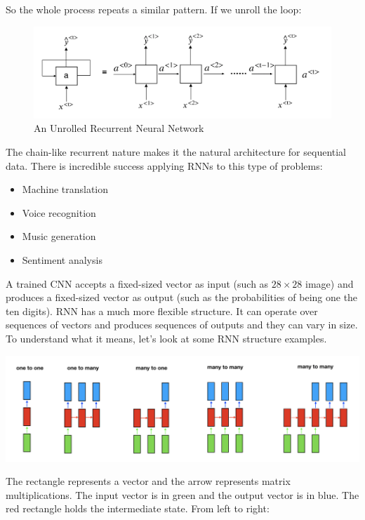 \documentclass[12pt,]{krantz}
\providecommand{\tightlist}{%
  \setlength{\itemsep}{0pt}\setlength{\parskip}{0pt}}
\begin{document}
So the whole process repeats a similar pattern. If we unroll the loop:

\begin{figure}

{\centering \includegraphics[width=0.9\linewidth]{images/rnnrollout} 

}

\caption{An Unrolled Recurrent Neural Network}\label{fig:unrolledrnn}
\end{figure}

The chain-like recurrent nature makes it the natural architecture for sequential data. There is incredible success applying RNNs to this type of problems:

\begin{itemize}
\tightlist
\item
  Machine translation
\item
  Voice recognition
\item
  Music generation
\item
  Sentiment analysis
\end{itemize}

A trained CNN accepts a fixed-sized vector as input (such as \(28 \times 28\) image) and produces a fixed-sized vector as output (such as the probabilities of being one the ten digits). RNN has a much more flexible structure. It can operate over sequences of vectors and produces sequences of outputs and they can vary in size. To understand what it means, let's look at some RNN structure examples.

\includegraphics[width=1\textwidth,height=\textheight]{images/rnnstrs.png}

The rectangle represents a vector and the arrow represents matrix multiplications. The input vector is in green and the output vector is in blue. The red rectangle holds the intermediate state. From left to right:
\end{document}
